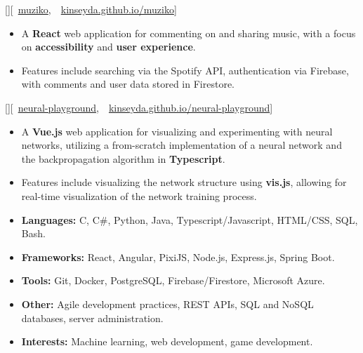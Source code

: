 \documentclass{article}
\begin{document}
[][\faGithub\
	\href{https://github.com/kinseyda/muziko}{muziko},\
	\faGlobe\
	\href{https://kinseyda.github.io/muziko/}{kinseyda.github.io/muziko}]

\begin{itemize}
	\item A \textbf{React} web application for commenting on and sharing music,
	      with a focus on \textbf{accessibility} and \textbf{user experience}.
	\item Features include searching via the Spotify API, authentication via
	      Firebase, with comments and user data stored in Firestore.
\end{itemize}

\experience{Neural Playground}[][\faGithub\
	\href{https://github.com/kinseyda/neural-playground}{neural-playground},\
	\faGlobe\
	\href{https://kinseyda.github.io/neural-playground/}{kinseyda.github.io/neural-playground}]

\begin{itemize}
	\item A \textbf{Vue.js} web application for visualizing and experimenting
	      with neural networks, utilizing a from-scratch implementation of a
	      neural network and the backpropagation algorithm in
	      \textbf{Typescript}.
	\item Features include visualizing the network structure using
	      \textbf{vis.js}, allowing for real-time visualization of the network
	      training process.
\end{itemize}

\vspace*{\fill}

\fancySection{Skills}

\begin{itemize}
	\item \textbf{Languages:} C, C\#, Python, Java, Typescript/Javascript,
	      HTML/CSS, SQL, Bash.
	\item \textbf{Frameworks:} React, Angular, PixiJS, Node.js, Express.js,
	      Spring Boot.
	\item \textbf{Tools:} Git, Docker, PostgreSQL, Firebase/Firestore,
	      Microsoft Azure.
	\item \textbf{Other:} Agile development practices, REST APIs, SQL and NoSQL
	      databases, server administration.
	\item \textbf{Interests:} Machine learning, web development, game
	      development.
\end{itemize}
\end{document}
